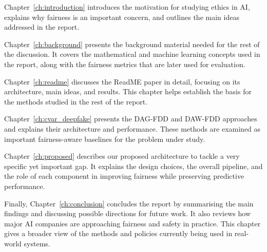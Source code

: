 \documentclass[a4paper,12pt,twoside]{report}
\begin{document}
Chapter~\ref{ch:introduction}
introduces the motivation for studying ethics in AI, explains why fairness is an
important concern, and outlines the main ideas addressed in the report.

Chapter~\ref{ch:background} presents the background material needed for the rest of
the discussion. It covers the mathematical and machine learning concepts used in the
report, along with the fairness metrics that are later used for evaluation.

Chapter~\ref{ch:readme} discusses the ReadME paper in detail, focusing on its
architecture, main ideas, and results. This chapter helps establish the basis for the
methods studied in the rest of the report.

Chapter~\ref{ch:cvar_deepfake} presents the DAG-FDD and DAW-FDD approaches and explains
their architecture and performance. These methods are examined as important fairness-aware
baselines for the problem under study.

Chapter~\ref{ch:proposed} describes our proposed architecture to tackle a very specific yet important gap. It explains the
design choices, the overall pipeline, and the role of each component in improving fairness
while preserving predictive performance.

Finally, Chapter~\ref{ch:conclusion} concludes the report by summarising the main
findings and discussing possible directions for future work. It also reviews how major AI companies are approaching
fairness and safety in practice. This chapter gives a broader view of the methods and
policies currently being used in real-world systems.

\cleardoublepage
{}
\cleardoublepage
{}
\end{document}
